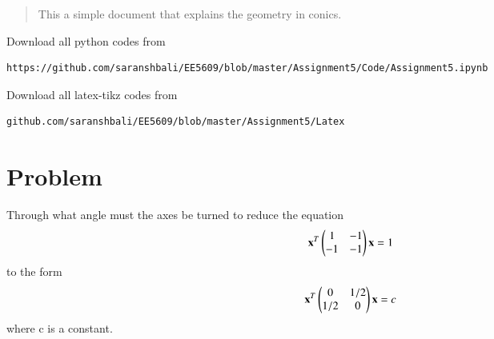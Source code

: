 \documentclass[journal,12pt,twocolumn]{IEEEtran}
\begin{document}
%
\begin{abstract}
This a simple document that explains the geometry in conics.
\end{abstract}
Download all python codes from 
%
\begin{lstlisting}
https://github.com/saranshbali/EE5609/blob/master/Assignment5/Code/Assignment5.ipynb
\end{lstlisting}
%
Download all latex-tikz codes from 
% 
\begin{lstlisting}
github.com/saranshbali/EE5609/blob/master/Assignment5/Latex
\end{lstlisting}
%
\section{Problem}
Through what angle must the axes be turned to reduce the equation
\begin{align}
	\mathbf{x}^T\begin{pmatrix} 1 & -1 \\ -1 & -1\end{pmatrix}\mathbf{x} = 1 \label{1}
\end{align}
to the form
\begin{align}
	\mathbf{x}^T\begin{pmatrix} 0 & 1/2 \\ 1/2 & 0\end{pmatrix}\mathbf{x} = c \label{2}
\end{align}
where c is a constant.
\end{document}
